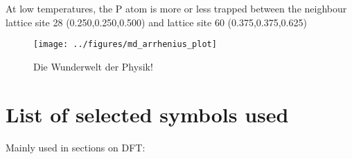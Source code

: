 \documentclass[11pt]{scrbook}   %
\begin{document}


   



At low temperatures, the P atom is more or less trapped between the neighbour lattice site 28 (0.250,0.250,0.500) and lattice site 60 (0.375,0.375,0.625)


\begin{figure}[htbp]
  \begin{center}
    \texttt{[image: ../figures/md\_arrhenius\_plot]}
  \end{center}
  \caption{
    Die Wunderwelt der Physik!
  }
  \label{fig:md_arrhenius_plot}
\end{figure}


\chapter{List of selected symbols used}
  Mainly used in sections on DFT:
\end{document}
